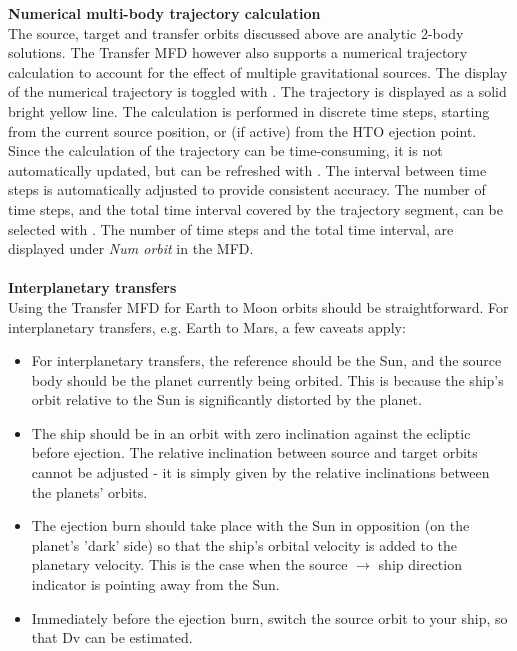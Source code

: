 \documentclass[Orbiter User Manual.tex]{subfiles}
\begin{document}
\textbf{Numerical multi-body trajectory calculation}\\
The source, target and transfer orbits discussed above are analytic 2-body solutions. The Transfer MFD however also supports a numerical trajectory calculation to account for the effect of multiple gravitational sources. The display of the numerical trajectory is toggled with \Shift{}. The trajectory is displayed as a solid bright yellow line. The calculation is performed in discrete time steps, starting from the current source position, or (if active) from the HTO ejection point. Since the calculation of the trajectory can be time-consuming, it is not automatically updated, but can be refreshed with \Shift{}. The interval between time steps is automatically adjusted to provide consistent accuracy. The number of time steps, and the total time interval covered by the trajectory segment, can be selected with \Shift{}. The number of time steps and the total time interval, are displayed under \textit{Num orbit} in the MFD.\\
\\
\textbf{Interplanetary transfers}\\
Using the Transfer MFD for Earth to Moon orbits should be straightforward. For interplanetary transfers, e.g. Earth to Mars, a few caveats apply:
\begin{itemize}
\item For interplanetary transfers, the reference should be the Sun, and the source body should be the planet currently being orbited. This is because the ship's orbit relative to the Sun is significantly distorted by the planet.
\item The ship should be in an orbit with zero inclination against the ecliptic before ejection. The relative inclination between source and target orbits cannot be adjusted - it is simply given by the relative inclinations between the planets' orbits.
\item The ejection burn should take place with the Sun in opposition (on the planet's 'dark' side) so that the ship's orbital velocity is added to the planetary velocity. This is the case when the source $\rightarrow$ ship direction indicator is pointing away from the Sun.
\item Immediately before the ejection burn, switch the source orbit to your ship, so that Dv can be estimated.
\end{itemize}
\end{document}
